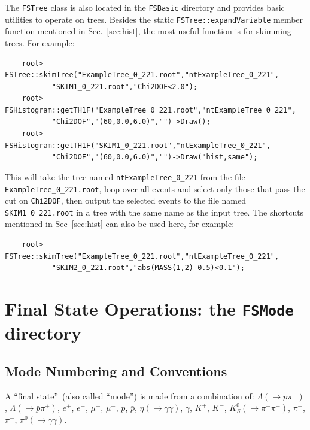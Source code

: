 \documentclass[11pt]{article}
\begin{document}
The {\tt FSTree} class is also located in the {\tt FSBasic} directory and provides basic utilities to operate on trees.  
Besides the static {\tt FSTree::expandVariable} member function mentioned in Sec.~\ref{sec:hist}, the most useful function is for skimming trees.  For example:
\begin{verbatim}
    root> FSTree::skimTree("ExampleTree_0_221.root","ntExampleTree_0_221",
           "SKIM1_0_221.root","Chi2DOF<2.0"); 
    root> FSHistogram::getTH1F("ExampleTree_0_221.root","ntExampleTree_0_221",
           "Chi2DOF","(60,0.0,6.0)","")->Draw();
    root> FSHistogram::getTH1F("SKIM1_0_221.root","ntExampleTree_0_221",
           "Chi2DOF","(60,0.0,6.0)","")->Draw("hist,same");
\end{verbatim}
This will take the tree named {\tt ntExampleTree\_0\_221} from the file {\tt ExampleTree\_0\_221.root}, loop over all events and select only those that pass the cut on {\tt Chi2DOF}, then output the selected events to the file named {\tt SKIM1\_0\_221.root} in a tree with the same name as the input tree.  The shortcuts mentioned in Sec~\ref{sec:hist} can also be used here, for example:
\begin{verbatim}
    root> FSTree::skimTree("ExampleTree_0_221.root","ntExampleTree_0_221",
           "SKIM2_0_221.root","abs(MASS(1,2)-0.5)<0.1"); 
\end{verbatim}


\section{Final State Operations:  the {\tt FSMode} directory}
\label{sec:modes}

\subsection{Mode Numbering and Conventions}
\label{sec:modeconv}

A ``final state''~(also called ``mode'') is made from a combination of: $\Lambda (\to p \pi^-)$, $\bar{\Lambda} (\to \bar{p} \pi^+)$, $e^+$, $e^-$, $\mu^+$, $\mu^-$, $p$, $\bar{p}$, $\eta (\to \gamma\gamma)$, $\gamma$, $K^+$, $K^-$, $K^0_S (\to \pi^+\pi^-)$, $\pi^+$, $\pi^-$, $\pi^0 (\to \gamma\gamma)$.
\end{document}
